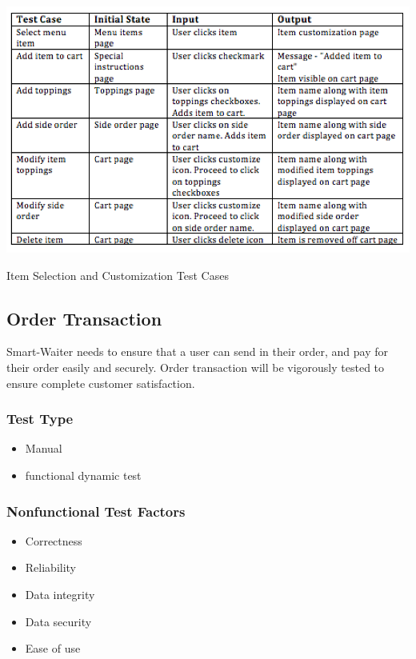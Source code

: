 \documentclass[12pt]{article}
\begin{document}
\begin{table}[h]
\includegraphics[width=\textwidth,height=\textheight,keepaspectratio]{itemselection.png}
  \caption{Item Selection and Customization Test Cases}
\end{table}

\subsection{Order Transaction}
Smart-Waiter needs to ensure that a user can send in their order, and pay for their order easily and securely. Order transaction will be vigorously tested to ensure complete customer satisfaction.  
\subsubsection{Test Type}
\begin{itemize}
  \item Manual 
  \item functional dynamic test 
 \end{itemize} 
\subsubsection{Nonfunctional Test Factors}
\begin{itemize}
  \item Correctness 
  \item Reliability 
  \item Data integrity 
  \item Data security 
  \item Ease of use
 \end{itemize} 
 
\end{document}
